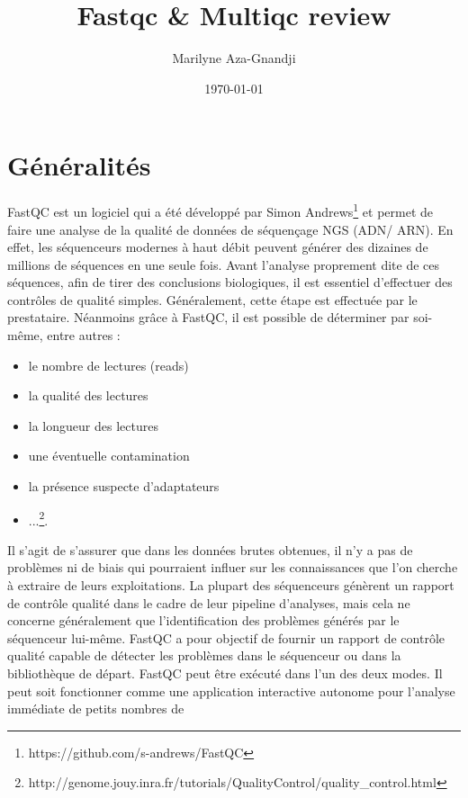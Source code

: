 \documentclass[a4paper,11pt]{article}
\begin{document}
\title{Fastqc \& Multiqc review}
\author{Marilyne Aza-Gnandji}
\date{\today}

\maketitle
\tableofcontents

\section{Généralités}

FastQC est un logiciel qui a été développé par Simon
Andrews\footnote{{https://github.com/s-andrews/FastQC}} et permet de
faire une analyse de la qualité de données de séquençage NGS (ADN/
ARN). En effet, les séquenceurs modernes à haut débit peuvent générer
des dizaines de millions de séquences en une seule fois.  Avant
l'analyse proprement dite de ces séquences, afin de tirer des
conclusions biologiques, il est essentiel d'effectuer des contrôles de
qualité simples. Généralement, cette étape est effectuée par le
prestataire. Néanmoins grâce à FastQC, il est possible de déterminer
par soi-même, entre autres :
\begin{itemize}
  \item[\textbullet] le nombre de lectures (reads)
   \item[\textbullet] la qualité des lectures
    \item[\textbullet] la longueur des lectures
     \item[\textbullet] une éventuelle contamination
     \item[\textbullet] la présence suspecte d'adaptateurs
       \item[\textbullet]
         ...\footnote{{http://genome.jouy.inra.fr/tutorials/QualityControl/quality_control.html}}.
\end{itemize}
Il s'agit de s'assurer que dans les données brutes obtenues, il n'y a
pas de problèmes ni de biais qui pourraient influer sur les
connaissances que l'on cherche à extraire de leurs exploitations. La
plupart des séquenceurs génèrent un rapport de contrôle qualité dans
le cadre de leur pipeline d’analyses, mais cela ne concerne
généralement que l’identification des problèmes générés par le
séquenceur lui-même.  FastQC a pour objectif de fournir un rapport de
contrôle qualité capable de détecter les problèmes dans le séquenceur
ou dans la bibliothèque de départ. FastQC peut être exécuté dans l'un
des deux modes. Il peut soit fonctionner comme une application
interactive autonome pour l’analyse immédiate de petits nombres de
\end{document}
